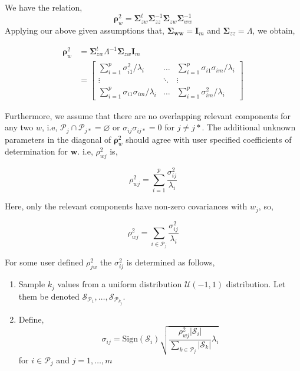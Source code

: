\documentclass[num-refs]{wiley-article}
\providecommand{\tightlist}{%
  \setlength{\itemsep}{0pt}\setlength{\parskip}{0pt}}
\begin{document}
We have the relation,
\[\boldsymbol{\rho}_w^2 = \boldsymbol{\Sigma}_{zw}^t\boldsymbol{\Sigma}_{zz}^{-1}\boldsymbol{\Sigma}_{zw}\boldsymbol{\Sigma}_{ww}^{-1}\]
Applying our above given assumptions that,
\(\boldsymbol{\Sigma_{ww}} = \mathbf{I}_m\) and
\(\boldsymbol{\Sigma}_{zz} = \Lambda\), we obtain,

\[
\begin{aligned}
\boldsymbol{\rho}_w^2 &= \boldsymbol{\Sigma}_{zw}^t \Lambda^{-1} \boldsymbol{\Sigma}_{zw} \mathbf{I}_m \\
&= \begin{bmatrix}
\sum_{i = 1}^p \sigma_{i1}^2/\lambda_i          & \ldots & \sum_{i = 1}^p \sigma_{i1}\sigma_{im}/\lambda_i \\
\vdots                                          & \ddots & \vdots \\
\sum_{i = 1}^p \sigma_{i1}\sigma_{im}/\lambda_i & \ldots & \sum_{i = 1}^p \sigma_{im}^2/\lambda_i
\end{bmatrix}
\end{aligned}
\]

Furthermore, we assume that there are no overlapping relevant components
for any two \(w\), i.e,
\(\mathcal{P}_j \cap \mathcal{P}_{j*} = \varnothing\) or
\(\sigma_{ij}\sigma_{ij*} = 0\) for \(j\ne j*\). The additional unknown
parameters in the diagonal of \(\boldsymbol{\rho}_w^2\) should agree
with user specified coefficients of determination for \(\mathbf{w}\).
i.e, \(\rho_{wj}^2\) is,

\[
\rho_{wj}^2 = \sum_{i = 1}^p\frac{\sigma_{ij}^2}{\lambda_i}
\]

Here, only the relevant components have non-zero covariances with
\(w_j\), so,

\[
\rho_{wj}^2 = \sum_{i \in \mathcal{P}_j}\frac{\sigma_{ij}^2}{\lambda_i}
\]

For some user defined \(\rho_{jw}^2\) the \(\sigma_{ij}^2\) is
determined as follows,

\begin{enumerate}
\def\labelenumi{\arabic{enumi}.}
\tightlist
\item
  Sample \(k_j\) values from a uniform distribution
  \(\mathcal{U}(-1, 1)\) distribution. Let them be denoted
  \(\mathcal{S}_{\mathcal{P}_1}, \ldots, \mathcal{S}_{\mathcal{P}_{k_j}}\).
\item
  Define,
  \[\sigma_{ij} = \text{Sign}\left(\mathcal{S}_i\right)\sqrt{\frac{\rho_{wj}^2\left|\mathcal{S}_i\right|}{\sum_{k\in \mathcal{P}_j}\left|\mathcal{S}_k\right|} \lambda_i}\]
  for \(i \in \mathcal{P}_j\) and \(j = 1, \ldots, m\)
\end{enumerate}
\end{document}
